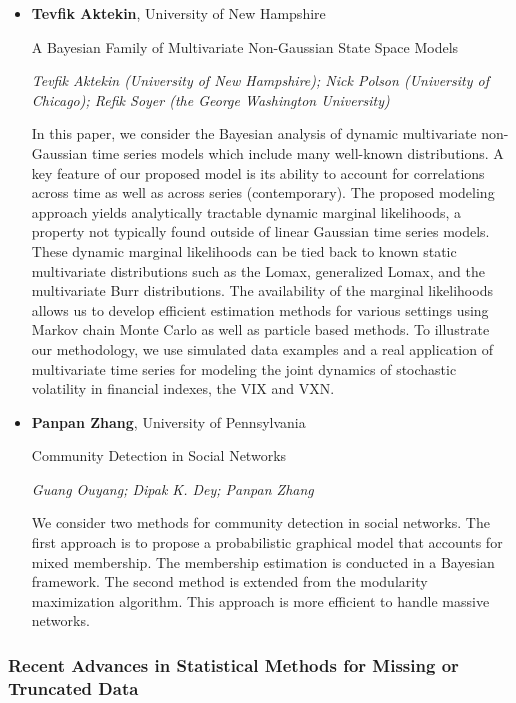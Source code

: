 \begin{itemize}
\item \textbf{Tevfik Aktekin}, University of New Hampshire

A Bayesian Family of Multivariate Non-Gaussian State Space Models

\emph{\footnotesize Tevfik Aktekin (University of New Hampshire); Nick Polson (University of Chicago); Refik Soyer (the George Washington University)}

In this paper, we consider the Bayesian analysis of dynamic multivariate non-Gaussian time series models which include many well-known distributions. A key feature of our proposed model is its ability to account for correlations across time as well as across series (contemporary). The proposed modeling approach yields analytically tractable dynamic marginal likelihoods, a property not typically found outside of linear Gaussian time series models. These dynamic marginal likelihoods can be tied back to known static multivariate distributions such as the Lomax, generalized Lomax, and the multivariate Burr distributions. The availability of the marginal likelihoods allows us to develop efficient estimation methods for various settings using Markov chain Monte Carlo as well as particle based methods. To illustrate our methodology, we use simulated data examples and a real application of multivariate time series for modeling the joint dynamics of stochastic volatility in financial indexes, the VIX and VXN.

\item \textbf{Panpan Zhang}, University of Pennsylvania

Community Detection in Social Networks

\emph{\footnotesize Guang Ouyang; Dipak K. Dey; Panpan Zhang}

We consider two methods for community detection in social networks. The first approach is to propose a probabilistic graphical model that accounts for mixed membership. The membership estimation is conducted in a Bayesian framework. The second method is extended from the modularity maximization algorithm. This approach is more efficient to handle massive networks.

\end{itemize}

\subsubsection*{Recent Advances in Statistical Methods for Missing or Truncated Data}

